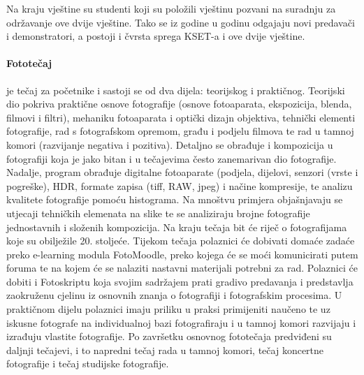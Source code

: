 \documentclass[12pt,a4paper,oneside]{article}
\begin{document}
Na kraju vještine su studenti koji su položili vještinu pozvani na suradnju za održavanje ove dvije vještine. Tako se iz godine u godinu odgajaju novi predavači i demonstratori, a postoji i čvrsta sprega KSET-a i ove dvije vještine.
	

	\paragraph{Fototečaj}je tečaj za početnike i sastoji se od dva dijela: teorijskog i praktičnog. Teorijski dio  pokriva praktične osnove fotografije (osnove fotoaparata, ekspozicija, blenda, filmovi i filtri), mehaniku  fotoaparata i optički dizajn objektiva, tehnički elementi fotografije, rad s fotografskom opremom, građu i podjelu filmova te rad u tamnoj komori (razvijanje negativa i pozitiva). Detaljno se obrađuje i kompozicija u fotografiji  koja je jako bitan i u tečajevima često zanemarivan dio fotografije. Nadalje, program obrađuje digitalne fotoaparate (podjela, dijelovi, senzori  (vrste i pogreške), HDR, formate zapisa (tiff, RAW, jpeg) i načine kompresije, te analizu kvalitete fotografije pomoću histograma. Na mnoštvu primjera objašnjavaju se utjecaji tehničkih elemenata na slike te se analiziraju brojne fotografije jednostavnih i složenih kompozicija. Na kraju tečaja bit će riječ o fotografijama koje su obilježile 20. stoljeće. Tijekom tečaja polaznici će dobivati domaće zadaće preko e-learning modula FotoMoodle, preko kojega će se moći komunicirati putem foruma te na kojem će se nalaziti nastavni materijali potrebni za rad. Polaznici će dobiti i Fotoskriptu koja svojim sadržajem prati gradivo predavanja i predstavlja zaokruženu cjelinu iz osnovnih znanja o fotografiji i fotografskim procesima. U praktičnom dijelu polaznici imaju priliku u praksi primijeniti naučeno te uz iskusne fotografe na individualnoj bazi fotografiraju i u tamnoj komori razvijaju i izrađuju vlastite fotografije. Po završetku osnovnog fototečaja predviđeni su daljnji tečajevi, i to napredni tečaj rada u tamnoj komori, tečaj koncertne fotografije i tečaj studijske fotografije.
\end{document}
